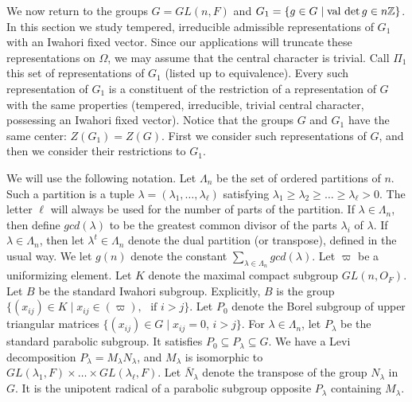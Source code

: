 \documentclass{amsart}
\begin{document}
\medskip\noindent
We now return to the groups $ G=GL(n,F) $
and 
  $G_1=\{g\in G\mid \text{val\,}\det g\in n{\Bbb Z}\}$.
In this section we study tempered, irreducible admissible
  representations of $G_1$ with an Iwahori fixed vector.  Since our applications 
  will truncate these representations on $\Omega$, we
  may assume that the central character is trivial.
Call 
  $ \Pi_1$
this set of representations of $G_1$
  (listed up to equivalence).
Every such representation of $G_1$ is a constituent
  of the restriction of a representation of $G$ with 
  the same properties (tempered, irreducible, trivial central character,
   possessing an Iwahori fixed vector).
Notice that the groups $G$ and $G_1$ have the same center:
  $Z(G_1) = Z(G)$.
First we consider such representations of 
$G$, and then we consider their restrictions to $G_1$.

We will use the following notation.  
Let $\Lambda_n$ be
  the set of ordered partitions of $n$.  Such a partition is a tuple
  $ \lambda = (\lambda_1, \dots , \lambda_{\ell})$ satisfying
    $\lambda_1 \geq \lambda_2 \geq \dots \geq\lambda_{\ell} > 0 $.
    The letter $\ell$ will always be used for the number of
    parts of the partition.
  If 
  $ \lambda \in \Lambda_n$, then define  $gcd (\lambda)$ to be the
  greatest common divisor of the parts
  $ \lambda_i$ of $\lambda$.
  If $\lambda\in \Lambda_n$, then let $\lambda^t\in\Lambda_n$ 
  denote the dual partition (or transpose), defined in the usual way.
We let $g(n)$ denote the constant
  $ \sum\limits_{\lambda \in \Lambda_n}
  gcd (\lambda) $.
%
Let 
$\varpi$ be
  a uniformizing element.  Let $K$ denote the maximal
  compact subgroup $GL(n,O_F)$.  Let
$B$ be the standard Iwahori subgroup.  Explicitly, $B$ is the group
  $ \{
      (x_{ij}) \in K \mid
       x_{ij} \in (\varpi), \,\,
    \text{ if }  i > j
    \} $.
Let $P_0$ denote the 
    Borel subgroup of upper triangular matrices
      $ \{ (x_{ij}) \in G \mid x_{ij} = 0 $,
      $ i > j \} $.
%
For $\lambda\in \Lambda_n$, let $P_\lambda$ be the
    standard parabolic subgroup.  It satisfies
      $ P_0 \subseteq P_{\lambda} \subseteq G $.
%
We have a Levi decomposition
$P_{\lambda}=M_{\lambda}N_{\lambda}$,
and
      $ M_{\lambda} $
    is isomorphic to 
      $ GL(\lambda_1, F)\times \dots \times 
        GL(\lambda_{\ell}, F) $.
%
Let $\bar N_\lambda$ denote the transpose of the group
$N_\lambda$ in $G$.  It is the unipotent radical of a
parabolic subgroup opposite $P_\lambda$ containing $M_\lambda$.
\end{document}
